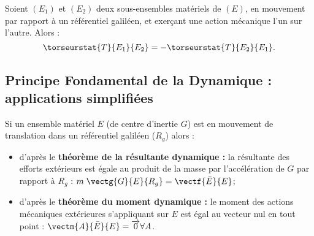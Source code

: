 \begin{theoreme}

Soient $(E_1)$ et $(E_2)$ deux sous-ensembles matériels de $(E)$,
en mouvement par rapport à un référentiel galiléen, et exerçant une action mécanique l'un sur l'autre. Alors :
	$$\torseurstat{T}{E_1}{E_2}=-\torseurstat{T}{E_2}{E_1}.$$
\end{theoreme}
		


\subsection[PFD : applications simplifiées]{Principe Fondamental de la Dynamique : applications simplifiées}


\begin{defi}
Si un ensemble matériel $E$ (de centre d'inertie $G$) est en mouvement de translation dans un référentiel galiléen ($R_g$) alors : 

\begin{itemize}
\item d'après le \textbf{théorème de la résultante dynamique : } la résultante des efforts extérieurs est égale au produit de la masse par l'accélération de $G$ par rapport à $R_g$ :
$
m\;\vectg{G}{E}{R_g}=\vectf{\bar E}{E}$;%
\item d'après le \textbf{théorème du moment dynamique : } le moment des actions mécaniques extérieures s'appliquant sur $E$ est égal au vecteur nul en tout point :
$\vectm{A}{\bar E}{E}=\overrightarrow{0}\forall  A$.
\end{itemize}

\end{defi}
 



